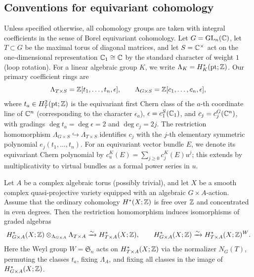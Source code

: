 \subsection{Conventions for equivariant cohomology}\label{sec_pre_equ_coho}

Unless specified otherwise, all cohomology groups are taken with integral coefficients
in the sense of Borel equivariant cohomology.
Let $G = \mathrm{GL}_n(\mathbb C)$, let $T \subset G$ be the maximal torus of diagonal matrices,
and let $S = \mathbb C^\times$ act on the one-dimensional representation $\mathbb C_1 \cong \mathbb C$ by
the standard character of weight $1$ (loop rotation).
For a linear algebraic group $K$, we write $\Lambda_K = H_K^*(\mathrm{pt}; \mathbb Z)$.
Our primary coefficient rings are
\begin{equation}\label{eq:coefficient_rings}
 \Lambda_{T\times S} = \mathbb Z[t_1,\dots,t_n,\epsilon], \qquad
 \Lambda_{G\times S} = \mathbb Z[c_1,\dots,c_n,\epsilon],
\end{equation}
where $t_a\in H^2_T(\mathrm{pt};\mathbb Z)$ is the equivariant first Chern class of the $a$-th coordinate line of $\mathbb C^n$ (corresponding to the character $\epsilon_a$), $\epsilon = c_1^S(\mathbb C_1)$, and $c_j = c_j^G(\mathbb C^n)$,
with gradings $\deg t_a = \deg\epsilon = 2$ and $\deg c_j = 2j$.
The restriction homomorphism $\Lambda_{G\times S}\hookrightarrow\Lambda_{T\times S}$ identifies
$c_j$ with the $j$-th elementary symmetric polynomial $e_j(t_1,\dots,t_n)$.
For an equivariant vector bundle $E$, we denote its equivariant Chern polynomial by
$c_u^K(E) = \sum_{j \ge 0} c_j^K(E) u^j$; this extends by multiplicativity to virtual bundles
as a formal power series in $u$.

\begin{lemma}\label{lem:borel}
Let $A$ be a complex algebraic torus (possibly trivial), and let $X$ be a
smooth complex quasi-projective variety equipped with an algebraic
$G\times A$-action.
Assume that the ordinary cohomology $H^*(X;\mathbb Z)$ is free over $\mathbb Z$ and
concentrated in even degrees.
Then the restriction homomorphism induces isomorphisms of graded algebras
\[
 H^*_{G\times A}(X;\mathbb Z)
 \otimes_{\Lambda_{G\times A}}\Lambda_{T\times A}
 \xrightarrow{\sim}H^*_{T\times A}(X;\mathbb Z),
 \qquad
 H^*_{G\times A}(X;\mathbb Z)
 \xrightarrow{\sim}H^*_{T\times A}(X;\mathbb Z)^W.
\]
Here the Weyl group $W = \mathfrak S_n$ acts on $H^*_{T\times A}(X;\mathbb Z)$ via the normalizer $N_G(T)$,
permuting the classes $t_a$, fixing $\Lambda_A$, and fixing all classes in the image of $H^*_{G\times A}(X;\mathbb Z)$.
\end{lemma}

